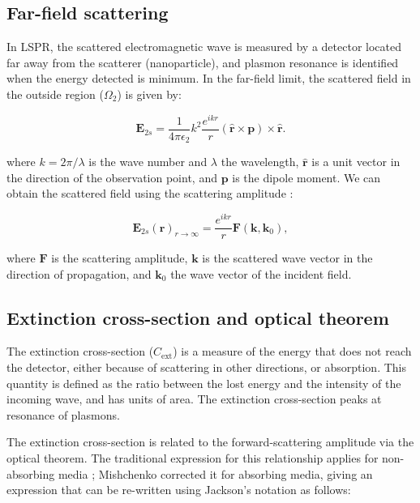 \subsection{Far-field scattering} \label{sec:ff_scattering}

In LSPR, the scattered electromagnetic wave is measured by a detector located far away 
from the scatterer (nanoparticle), and plasmon resonance is identified when the energy 
detected is minimum. In the far-field limit, the scattered field
in the outside region ($\Omega_2$) is given by: 

\begin{equation} \label{eq:scat_efield_long_range}
    \mathbf{E}_{2s} = \frac{1}{4\pi\epsilon_2}k^2\frac{e^{ikr}}{r} (\mathbf{\hat{r}} \times \mathbf{p})\times\mathbf{\hat{r}}.
\end{equation} 

\noindent where $k=2\pi/\lambda$ is the wave number and $\lambda$ the wavelength, $\mathbf{\hat{r}}$ 
is a unit vector in the direction of the observation point, and $\mathbf{p}$ is
the dipole moment.
We can obtain the scattered field using the 
scattering amplitude \cite{Jackson}:

\begin{equation} \label{eq:scat_efield_fwa}
    \mathbf{E}_{2s}(\mathbf{r})_{r\to\infty} = \frac{e^{ikr}}{r} \mathbf{F}(\mathbf{k},\mathbf{k}_0),
\end{equation}

\noindent where $\mathbf{F}$ is the scattering amplitude, $\mathbf{k}$ is the 
scattered wave vector in the direction of propagation, and $\mathbf{k}_0$ the 
wave vector of the incident field. 

\subsection{Extinction cross-section and optical theorem} \label{sec:cext_ot}

The extinction cross-section ($C_\text{ext}$) is a measure of the energy that 
does not reach the detector, either because of scattering in other directions,
or absorption. This quantity is defined as the ratio between the lost energy and 
the intensity of the incoming wave, and has units of area. 
The extinction cross-section peaks at resonance of plasmons.

The extinction cross-section is related to the forward-scattering amplitude via the optical theorem. 
The traditional expression for this relationship applies for non-absorbing media 
\cite{MayergoyzZhang2007, Jackson}; 
Mishchenko \cite{Mishchenko2007} corrected it for absorbing media, 
giving an expression that can be re-written using Jackson's notation \cite{Jackson} as follows:

